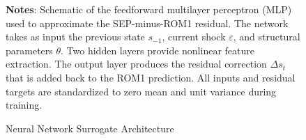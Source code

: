 \begin{figure}[h]
\caption{Neural Network Surrogate Architecture}
\label{fig:mlp_architecture}
\begin{flushleft}
\footnotesize
\textbf{Notes}: Schematic of the feedforward multilayer perceptron (MLP) used to approximate the SEP-minus-ROM1 residual. The network takes as input the previous state $s_{-1}$, current shock $\varepsilon$, and structural parameters $\theta$. Two hidden layers provide nonlinear feature extraction. The output layer produces the residual correction $\Delta s_t$ that is added back to the ROM1 prediction. All inputs and residual targets are standardized to zero mean and unit variance during training.
\end{flushleft}
\end{figure}

\clearpage
